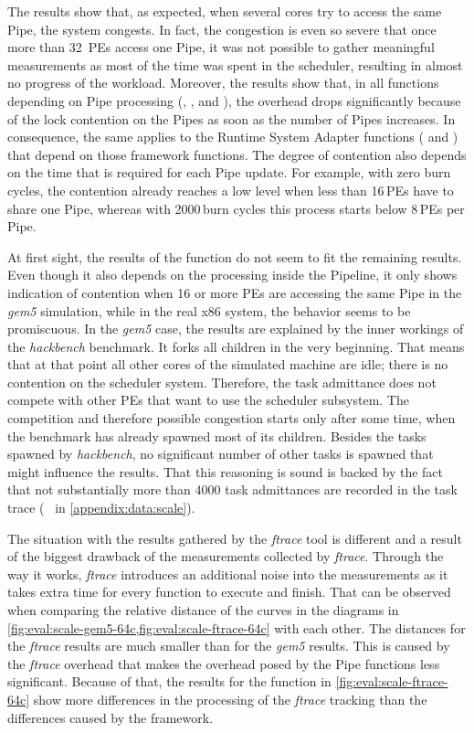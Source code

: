 The results show that, as expected, when several cores try to access the same Pipe, the system congests. In fact, the congestion is even so severe that once more than 32~\acp{PE} access one Pipe, it was not possible to gather meaningful measurements as most of the time was spent in the scheduler, resulting in almost no progress of the workload. Moreover, the results show that, in all functions depending on Pipe processing (, , and ), the overhead drops significantly because of the lock contention on the Pipes as soon as the number of Pipes increases. In consequence, the same applies to the Runtime System Adapter functions ( and ) that depend on those framework functions. The degree of contention also depends on the time that is required for each Pipe update. For example, with zero burn cycles, the contention already reaches a low level when less than \num{16}\,\acp{PE} have to share one Pipe, whereas with \num{2000}\,burn cycles this process starts below \num{8}\,\acp{PE} per Pipe.

At first sight, the results of the  function do not seem to fit the remaining results. Even though it also depends on the processing inside the Pipeline, it only shows indication of contention when 16 or more \acp{PE} are accessing the same Pipe in the \emph{gem5} simulation, while in the real x86 system, the behavior seems to be promiscuous. In the \emph{gem5} case, the results are explained by the inner workings of the \emph{hackbench} benchmark. It forks all children in the very beginning. That means that at that point all other cores of the simulated machine are idle; there is no contention on the scheduler system. Therefore, the task admittance does not compete with other \acp{PE} that want to use the scheduler subsystem. The competition and therefore possible congestion starts only after some time, when the benchmark has already spawned most of its children. Besides the tasks spawned by \emph{hackbench}, no significant number of other tasks is spawned that might influence the results. That this reasoning is sound is backed by the fact that not substantially more than \num{4000} task admittances are recorded in the task trace (\cf{}~ in \cref{appendix:data:scale}).

The situation with the results gathered by the \emph{ftrace} tool is different and a result of the biggest drawback of the measurements collected by \emph{ftrace}. Through the way it works, \emph{ftrace} introduces an additional noise into the measurements as it takes extra time for every function to execute and finish. That can be observed when comparing the relative distance of the curves in the diagrams in \cref{fig:eval:scale-gem5-64c,fig:eval:scale-ftrace-64c} with each other. The distances for the \emph{ftrace} results are much smaller than for the \emph{gem5} results. This is caused by the \emph{ftrace} overhead that makes the overhead posed by the Pipe functions less significant. Because of that, the results for the  function in \cref{fig:eval:scale-ftrace-64c} show more differences in the processing of the \emph{ftrace} tracking than the differences caused by the \cobas{} framework.

